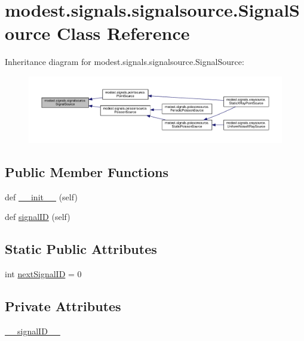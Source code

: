 \hypertarget{classmodest_1_1signals_1_1signalsource_1_1SignalSource}{}\section{modest.\+signals.\+signalsource.\+Signal\+Source Class Reference}
\label{classmodest_1_1signals_1_1signalsource_1_1SignalSource}


Inheritance diagram for modest.\+signals.\+signalsource.\+Signal\+Source\+:\nopagebreak
\begin{figure}[H]
\begin{center}
\leavevmode
\includegraphics[width=350pt]{classmodest_1_1signals_1_1signalsource_1_1SignalSource__inherit__graph}
\end{center}
\end{figure}
\subsection*{Public Member Functions}
\begin{DoxyCompactItemize}
\item 
def \hyperlink{classmodest_1_1signals_1_1signalsource_1_1SignalSource_abc71be8fa60c2431ee68d4b7752684f0}{\+\_\+\+\_\+init\+\_\+\+\_\+} (self)
\item 
def \hyperlink{classmodest_1_1signals_1_1signalsource_1_1SignalSource_a9a64c6a9c2954f6ad61e4ca3518ea8ab}{signal\+ID} (self)
\end{DoxyCompactItemize}
\subsection*{Static Public Attributes}
\begin{DoxyCompactItemize}
\item 
int \hyperlink{classmodest_1_1signals_1_1signalsource_1_1SignalSource_a453eafb550b551adbec0903deb63dfce}{next\+Signal\+ID} = 0
\end{DoxyCompactItemize}
\subsection*{Private Attributes}
\begin{DoxyCompactItemize}
\item 
\hyperlink{classmodest_1_1signals_1_1signalsource_1_1SignalSource_a8b8d7f422fe4de0e2f0add245c05b3c1}{\+\_\+\+\_\+signal\+I\+D\+\_\+\+\_\+}
\end{DoxyCompactItemize}


